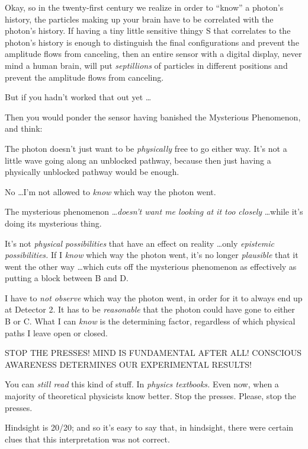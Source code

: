 {
 Okay, so in the twenty-first century we realize in order to
``know'' a photon's
history, the particles making up your brain have to be correlated with
the photon's history. If having a tiny little sensitive
thingy S that correlates to the photon's history is
enough to distinguish the final configurations and prevent the
amplitude flows from canceling, then an entire sensor with a digital
display, never mind a human brain, will put \textit{septillions} of
particles in different positions and prevent the amplitude flows from
canceling.}

{
 But if you hadn't worked that out yet \ldots}

{
 Then you would ponder the sensor having banished the Mysterious
Phenomenon, and think:}

{
 The photon doesn't just want to be
\textit{physically} free to go either way. It's not a
little wave going along an unblocked pathway, because then just having
a physically unblocked pathway would be enough.}

{
 No \ldots I'm not allowed to \textit{know} which
way the photon went.}

{
 The mysterious phenomenon \ldots \textit{doesn't
want me looking at it too closely} \ldots while it's
doing its mysterious thing.}

{
 It's not \textit{physical possibilities} that have
an effect on reality \ldots only \textit{epistemic possibilities.} If I
\textit{know} which way the photon went, it's no longer
\textit{plausible} that it went the other way \ldots which cuts off the
mysterious phenomenon as effectively as putting a block between B and
D.}

{
 I have to \textit{not observe} which way the photon went, in order
for it to always end up at Detector 2. It has to be \textit{reasonable}
that the photon could have gone to either B or C. What I can
\textit{know} is the determining factor, regardless of which physical
paths I leave open or closed.}

{
 STOP THE PRESSES! MIND IS FUNDAMENTAL AFTER ALL! CONSCIOUS
AWARENESS DETERMINES OUR EXPERIMENTAL RESULTS!}

{
 You can \textit{still read} this kind of stuff. In \textit{physics
textbooks.} Even now, when a majority of theoretical physicists know
better. Stop the presses. Please, stop the presses.}

{
 Hindsight is 20/20; and so it's easy to say that,
in hindsight, there were certain clues that this interpretation was not
correct.}

